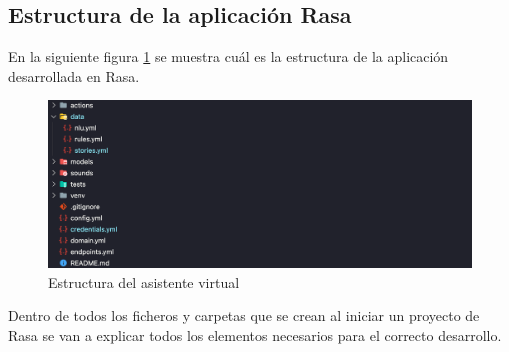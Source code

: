 \newpage
\subsection{Estructura de la aplicación Rasa}

En la siguiente figura \ref{fig:estructura_chatbot} se muestra cuál es la estructura de la aplicación desarrollada en Rasa.

\begin{figure}[H]
    \centering
    \includegraphics[width=\textwidth]{include/figuras/EstructuraChatbot.png}
    \caption{Estructura del asistente virtual}
    \label{fig:estructura_chatbot}
\end{figure}

Dentro de todos los ficheros y carpetas que se crean al iniciar un proyecto de Rasa se van a explicar todos los elementos necesarios para el correcto desarrollo.


